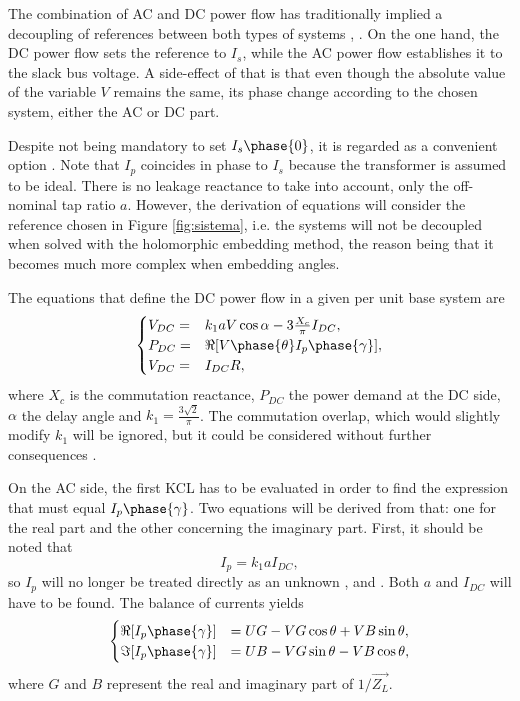\documentclass[conference]{IEEEtran}
\begin{document}
The combination of AC and DC power flow has traditionally implied a decoupling of references between both types of systems \cite{Arrillaga1978}, \cite{Arrillaga2002}. On the one hand, the DC power flow sets the reference to $I_s$, while the AC power flow establishes it to the slack bus voltage. A side-effect of that is that even though the absolute value of the variable $V$ remains the same, its phase change according to the chosen system, either the AC or DC part.

Despite not being mandatory to set $I_s\phase{0}$, it is regarded as a convenient option \cite{Arrillaga1994}. Note that $I_p$ coincides in phase to $I_s$ because the transformer is assumed to be ideal. There is no leakage reactance to take into account, only the off-nominal tap ratio $a$. However, the derivation of equations will consider the reference chosen in Figure \ref{fig:sistema}, i.e. the systems will not be decoupled when solved with the holomorphic embedding method, the reason being that it becomes much more complex when embedding angles.

The equations that define the DC power flow in a given per unit base system \cite{Arrillaga1994} are
\begin{equation}
  \begin{cases}
V_{DC}=&k_1aV\cos\alpha - 3\frac{X_c}{\pi}I_{DC},\\
P_{DC}=&\Re[V\phase{\theta}I_p\phase{\gamma}],\\
V_{DC}=&I_{DC}R,\\
  \end{cases}
    \label{eq:1}
  \end{equation}
where $X_c$ is the commutation reactance, $P_{DC}$ the power demand at the DC side, $\alpha$ the delay angle and $k_1=\frac{3\sqrt{2}}{\pi}$. The commutation overlap, which would slightly modify $k_1$ will be ignored, but it could be considered without further consequences \cite{Arrillaga1994}. 

On the AC side, the first KCL has to be evaluated in order to find the expression that must equal $I_p\phase{\gamma}$. Two equations will be derived from that: one for the real part and the other concerning the imaginary part. First, it should be noted that
\begin{equation}
  I_p=k_1aI_{DC},
  \label{eq:2}
\end{equation}
so $I_p$ will no longer be treated directly as an unknown \cite{Arrillaga1978}, \cite{Arrillaga1993} and \cite{Arrillaga1994}. Both $a$ and $I_{DC}$ will have to be found. The balance of currents yields 
\begin{equation}
  \begin{cases}
   \Re[I_p\phase{\gamma}]&=UG-VG\cos\theta+VB\sin\theta,\\
   \Im[I_p\phase{\gamma}]&=UB-VG\sin\theta-VB\cos\theta, \\
  \end{cases}
  \label{eq:3}
\end{equation}
where $G$ and $B$ represent the real and imaginary part of $1/\vec{Z_L}$.
\end{document}
